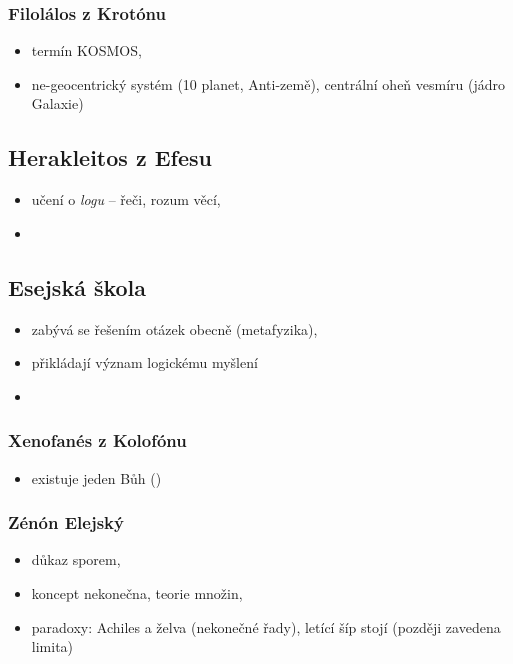 \documentclass[11pt,a4paper,czech]{article}
\begin{document}
    \subsubsection{Filolálos z Krotónu}

    \begin{itemize}
        \item termín KOSMOS,
        \item ne-geocentrický systém (10 planet, Anti-země), centrální oheň vesmíru (jádro Galaxie)
    \end{itemize}

\subsection{Herakleitos z Efesu}

\begin{itemize}
    \item učení o \textit{logu} -- řeči, rozum věcí,
    \item {}
\end{itemize}

\subsection{Esejská škola}

    \begin{itemize}
        \item zabývá se řešením otázek obecně (metafyzika),
        \item přikládají význam logickému myšlení
        \item 
    \end{itemize}

    \subsubsection{Xenofanés z Kolofónu}

    \begin{itemize}
        \item existuje jeden Bůh ()
    \end{itemize}

    \subsubsection{Zénón Elejský}
    
    \begin{itemize}
        \item důkaz sporem,
        \item koncept nekonečna, teorie množin,
        \item paradoxy: Achiles a želva (nekonečné řady), letící šíp stojí (později zavedena limita)
    \end{itemize}
\end{document}
